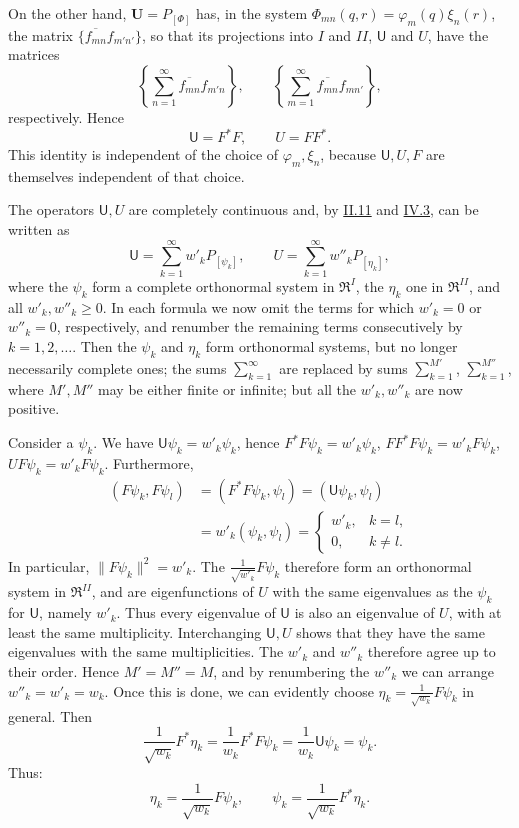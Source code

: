 \documentclass[fontsize=13pt,twoside,openany,headings=normal,parskip=false,bookmarkpackage=false,DIV=calc]{scrbook}
\begin{document}
On the other hand, $\boldsymbol U=P_{[\Phi]}$ has, in the system $\Phi_{mn}(q,r)=\varphi_m(q)\xi_n(r)$, the matrix $\{\overline{f_{mn}}f_{m'n'}\}$, so that its projections into $I$ and $II$, $\mathsf U$ and $U$, have the matrices
\[
 \left\{\sum_{n=1}^{\infty}\overline{f_{mn}}f_{m'n}\right\},\qquad
 \left\{\sum_{m=1}^{\infty}\overline{f_{mn}}f_{mn'}\right\},
\]
respectively. Hence
\[
 \mathsf U=F^*F,\qquad U=FF^*.
\]
This identity is independent of the choice of $\varphi_m,\xi_n$, because $\mathsf U,U,F$ are themselves independent of that choice.

The operators $\mathsf U,U$ are completely continuous and, by \hyperref[sec:II.11]{II.11} and \hyperref[sec:IV.3]{IV.3}, can be written as
\[
 \mathsf U=\sum_{k=1}^{\infty}w'_kP_{[\psi_k]},\qquad
 U=\sum_{k=1}^{\infty}w''_kP_{[\eta_k]},
\]
where the $\psi_k$ form a complete orthonormal system in $\mathfrak R^I$, the $\eta_k$ one in $\mathfrak R^{II}$, and all $w'_k,w''_k\geq0$. In each formula we now omit the terms for which $w'_k=0$ or $w''_k=0$, respectively, and renumber the remaining terms consecutively by $k=1,2,\ldots$. Then the $\psi_k$ and $\eta_k$ form orthonormal systems, but no longer necessarily complete ones; the sums $\sum_{k=1}^{\infty}$ are replaced by sums $\sum_{k=1}^{M'}$, $\sum_{k=1}^{M''}$, where $M',M''$ may be either finite or infinite; but all the $w'_k,w''_k$ are now positive.

Consider a $\psi_k$. We have $\mathsf U\psi_k=w'_k\psi_k$, hence $F^*F\psi_k=w'_k\psi_k$, $FF^*F\psi_k=w'_kF\psi_k$, $UF\psi_k=w'_kF\psi_k$. Furthermore,
\begin{align*}
 (F\psi_k,F\psi_l)&=(F^*F\psi_k,\psi_l)=(\mathsf U\psi_k,\psi_l)\\
 &=w'_k(\psi_k,\psi_l)
 =\begin{cases}w'_k,&k=l,\\0,&k\ne l.\end{cases}
\end{align*}
In particular, $\|F\psi_k\|^2=w'_k$. The $\frac{1}{\sqrt{w'_k}}F\psi_k$ therefore form an orthonormal system in $\mathfrak R^{II}$, and are eigenfunctions of $U$ with the same eigenvalues as the $\psi_k$ for $\mathsf U$, namely $w'_k$. Thus every eigenvalue of $\mathsf U$ is also an eigenvalue of $U$, with at least the same multiplicity. Interchanging $\mathsf U,U$ shows that they have the same eigenvalues with the same multiplicities. The $w'_k$ and $w''_k$ therefore agree up to their order. Hence $M'=M''=M$, and by renumbering the $w''_k$ we can arrange $w''_k=w'_k=w_k$. Once this is done, we can evidently choose $\eta_k=\frac{1}{\sqrt{w_k}}F\psi_k$ in general. Then
\[
 \frac{1}{\sqrt{w_k}}F^*\eta_k
 =\frac{1}{w_k}F^*F\psi_k=\frac{1}{w_k}\mathsf U\psi_k=\psi_k.
\]
Thus:
\[
 \eta_k=\frac{1}{\sqrt{w_k}}F\psi_k,\qquad
 \psi_k=\frac{1}{\sqrt{w_k}}F^*\eta_k.
\]
\hypertarget{origpage-231}{}%
\end{document}
